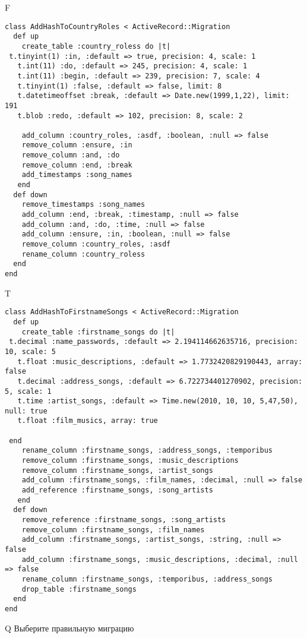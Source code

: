 F
\begin{verbatim}
class AddHashToCountryRoles < ActiveRecord::Migration
  def up
    create_table :country_roless do |t| 
 t.tinyint(1) :in, :default => true, precision: 4, scale: 1
   t.int(11) :do, :default => 245, precision: 4, scale: 1
   t.int(11) :begin, :default => 239, precision: 7, scale: 4
   t.tinyint(1) :false, :default => false, limit: 8
   t.datetimeoffset :break, :default => Date.new(1999,1,22), limit: 191
   t.blob :redo, :default => 102, precision: 8, scale: 2

    add_column :country_roles, :asdf, :boolean, :null => false
    remove_column :ensure, :in
    remove_column :and, :do
    remove_column :end, :break
    add_timestamps :song_names
   end
  def down
    remove_timestamps :song_names
    add_column :end, :break, :timestamp, :null => false
    add_column :and, :do, :time, :null => false
    add_column :ensure, :in, :boolean, :null => false
    remove_column :country_roles, :asdf
    rename_column :country_roless
  end
end
\end{verbatim}

T
\begin{verbatim}
class AddHashToFirstnameSongs < ActiveRecord::Migration
  def up
    create_table :firstname_songs do |t|
 t.decimal :name_passwords, :default => 2.194114662635716, precision: 10, scale: 5
   t.float :music_descriptions, :default => 1.7732420829190443, array: false
   t.decimal :address_songs, :default => 6.722734401270902, precision: 5, scale: 1
   t.time :artist_songs, :default => Time.new(2010, 10, 10, 5,47,50), null: true
   t.float :film_musics, array: true

 end
    rename_column :firstname_songs, :address_songs, :temporibus
    remove_column :firstname_songs, :music_descriptions
    remove_column :firstname_songs, :artist_songs
    add_column :firstname_songs, :film_names, :decimal, :null => false
    add_reference :firstname_songs, :song_artists
   end
  def down
    remove_reference :firstname_songs, :song_artists
    remove_column :firstname_songs, :film_names
    add_column :firstname_songs, :artist_songs, :string, :null => false
    add_column :firstname_songs, :music_descriptions, :decimal, :null => false
    rename_column :firstname_songs, :temporibus, :address_songs
    drop_table :firstname_songs
  end
end
\end{verbatim}
Q
Выберите правильную миграцию

